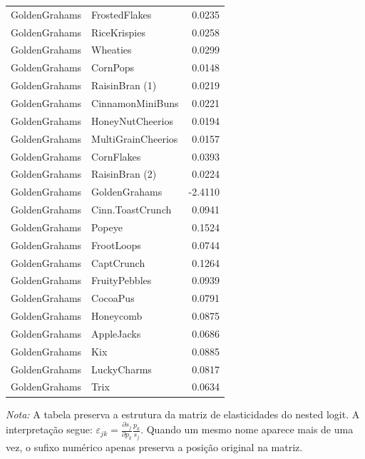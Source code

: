 \begin{table}[H]
\begin{tabular}{llr}
GoldenGrahams & FrostedFlakes & 0.0235 \\
GoldenGrahams & RiceKrispies & 0.0258 \\
GoldenGrahams & Wheaties & 0.0299 \\
GoldenGrahams & CornPops & 0.0148 \\
GoldenGrahams & RaisinBran (1) & 0.0219 \\
GoldenGrahams & CinnamonMiniBuns & 0.0221 \\
GoldenGrahams & HoneyNutCheerios & 0.0194 \\
GoldenGrahams & MultiGrainCheerios & 0.0157 \\
GoldenGrahams & CornFlakes & 0.0393 \\
GoldenGrahams & RaisinBran (2) & 0.0224 \\
GoldenGrahams & GoldenGrahams & -2.4110 \\
GoldenGrahams & Cinn.ToastCrunch & 0.0941 \\
GoldenGrahams & Popeye & 0.1524 \\
GoldenGrahams & FrootLoops & 0.0744 \\
GoldenGrahams & CaptCrunch & 0.1264 \\
GoldenGrahams & FruityPebbles & 0.0939 \\
GoldenGrahams & CocoaPus & 0.0791 \\
GoldenGrahams & Honeycomb & 0.0875 \\
GoldenGrahams & AppleJacks & 0.0686 \\
GoldenGrahams & Kix & 0.0885 \\
GoldenGrahams & LuckyCharms & 0.0817 \\
GoldenGrahams & Trix & 0.0634 \\
\bottomrule
\end{tabular}

\vspace{0.3em}
\footnotesize
\textit{Nota:} A tabela preserva a estrutura da matriz de elasticidades do nested logit. A interpretação segue: $\varepsilon_{jk}=\frac{\partial s_j}{\partial p_k}\frac{p_k}{s_j}$. Quando um mesmo nome aparece mais de uma vez, o sufixo numérico apenas preserva a posição original na matriz.
\end{table}
\endgroup


